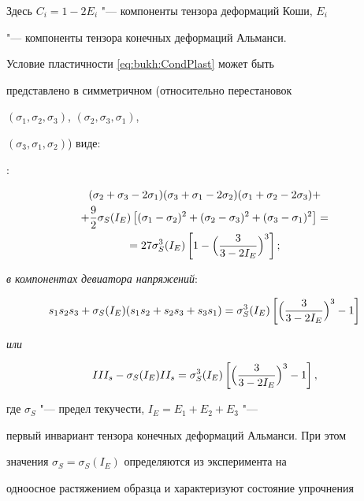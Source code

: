 Здесь $C_i=1-2E_i$ "--- компоненты тензора деформаций Коши, $E_i$

"--- компоненты тензора конечных деформаций Альманси.



Условие пластичности \eqref{eq:bukh:CondPlast} может быть

представлено в симметричном (относительно перестановок

$(\sigma_1,\sigma_2,\sigma_3)$, $(\sigma_2,\sigma_3,\sigma_1)$,

$(\sigma_3,\sigma_1,\sigma_2)$) виде:



:

\begin{multline}\label{eq:bukh:CondPlastStressComponents}

(\sigma_2+\sigma_3-2\sigma_1)(\sigma_3+\sigma_1-2\sigma_2)(\sigma_1+\sigma_2-2\sigma_3)+\\

+\frac{9}{2}\sigma_S(I_E)\left[(\sigma_1-\sigma_2)^2+(\sigma_2-\sigma_3)^2+(\sigma_3-\sigma_1)^2\right]=\\

=27\sigma_S^3(I_E)\left[1-\Bigl(\frac{3}{3-2I_E}\Bigr)^3\right];

\end{multline}

{\sl в компонентах девиатора напряжений}:

\begin{equation*}

s_1s_2s_3+\sigma_S(I_E)(s_1s_2+s_2s_3+s_3s_1)=\sigma_S^3(I_E)\left[\Bigl(\frac{3}{3-2I_E}\Bigr)^3-1\right]

\end{equation*}

{\sl или}

\begin{equation*}

III_s -\sigma_S(I_E) II_s=\sigma_S^3(I_E)\left[\Bigl(\frac{3}{3-2I_E}\Bigr)^3-1\right],

\end{equation*}

где $\sigma_S$ "--- предел текучести, $I_E=E_1+E_2+E_3$ "---

первый инвариант тензора конечных деформаций Альманси. При этом

значения $\sigma_S=\sigma_S(I_E)$ определяются из эксперимента на

одноосное растяжением образца и характеризуют состояние упрочнения

